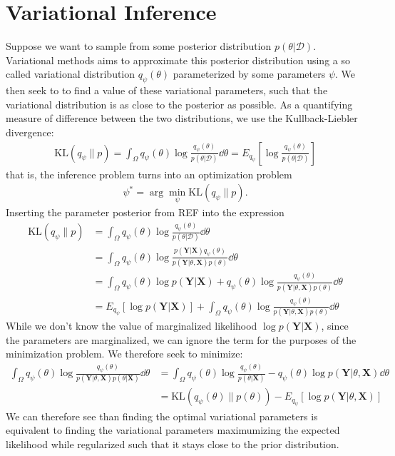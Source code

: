 \section{Variational Inference}

Suppose we want to sample from some posterior distribution $p(\theta | \mathcal{D})$. 
Variational methods aims to approximate this posterior distribution using a so called variational distribution $q_\psi (\theta)$ parameterized by some parameters $\psi$.  
We then seek to to find a value of these variational parameters, such that the variational distribution is as close to the posterior as possible. 
As a quantifying measure of difference between the two distributions, we use the Kullback-Liebler divergence:
\begin{align}
    \text{KL}(q_\psi\parallel p) 
    = \int_{\Omega} q_\psi(\theta)\log{\frac{q_\psi(\theta)}{p(\theta|\mathcal{D})}} \dd{\theta} 
    = E_{q_\psi}\left[\log{\frac{q_\psi(\theta)}{p(\theta|\mathcal{D})}}\right]
\end{align}
that is, the inference problem turns into an optimization problem 
\begin{align}
    \psi^\ast=\arg\min_{\psi}{\text{KL}(q_\psi\parallel p)}.
\end{align}
Inserting the parameter posterior from REF into the expression
\begin{align}
    \text{KL}(q_\psi\parallel p) 
    &= \int_{\Omega} q_\psi(\theta)\log{\frac{q_\psi(\theta)}{p(\theta|\mathcal{D})}} \dd{\theta} \\
    &= \int_{\Omega} q_\psi(\theta)\log{\frac{p(\bm{Y}|\bm{X})q_\psi(\theta)}{p(\bm{Y} |\theta, \bm{X}) p(\theta)}} \dd{\theta} \\
    &= \int_{\Omega} q_\psi(\theta)\log{p(\bm Y|\bm{X})} + q_\psi(\theta)\log{\frac{q_\psi(\theta)}{p(\bm{Y} |\theta, \bm{X}) p(\theta)}} \dd{\theta} \\
    &= E_{q_{\psi}} [\log{p(\bm{Y}|\bm{X})}] + \int_{\Omega} q_\psi(\theta)\log{\frac{q_\psi(\theta)}{p(\bm{Y} |\theta, \bm{X}) p(\theta)}} \dd{\theta} 
\end{align}
While we don't know the value of marginalized likelihood $\log{p(\bm{Y}|\bm{X})}$, since the parameters are marginalized, we can ignore the term for the purposes of the minimization problem.
We therefore seek to minimize:
\begin{align}
    \int_{\Omega} q_\psi(\theta)\log{\frac{q_\psi(\theta)}{p(\bm{Y} |\theta, \bm{X}) p(\theta|\bm{X})}} \dd{\theta} 
    &= \int_{\Omega} q_\psi(\theta) \log{\frac{q_\psi(\theta)}{p(\theta|\bm{X})}} -q_\psi(\theta)\log{p(\bm{Y} |\theta, \bm{X})} \dd{\theta}\\
    &= \text{KL}(q_\psi(\theta) \parallel p(\theta))  - E_{q_\psi}\left[ \log{p(\bm{Y} |\theta, \bm{X})}  \right] 
\end{align}
We can therefore see than finding the optimal variational parameters is equivalent to finding the variational parameters maximumizing the expected likelihood while regularized such that it stays close to the prior distribution. 


